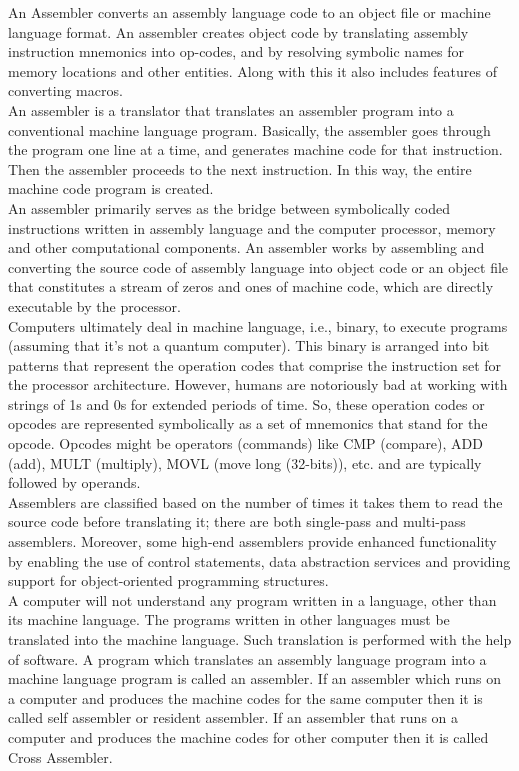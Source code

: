 \documentclass[12pt]{article}
\begin{document}
An Assembler converts an assembly language code to an object file or machine language format. An assembler creates object code by translating assembly instruction mnemonics into op-codes, and by resolving symbolic names for memory locations and other entities. Along with this it also includes features of converting macros.
\\An assembler is a translator that translates an assembler program into a conventional machine language program. Basically, the assembler goes through the program one line at a time, and generates machine code for that instruction. Then the assembler proceeds to the next instruction. In this way, the entire machine code program is created.
\\

An assembler primarily serves as the bridge between symbolically coded instructions written in assembly language and the computer processor, memory and other computational components. An assembler works by assembling and converting the source code of assembly language into object code or an object file that constitutes a stream of zeros and ones of machine code, which are directly executable by the processor.
\\Computers ultimately deal in machine language, i.e., binary, to execute programs (assuming that it's not a quantum computer).  This binary is arranged into bit patterns that represent the operation codes that comprise the instruction set for the processor architecture.  However, humans are notoriously bad at working with strings of 1s and 0s for extended periods of time.  So, these operation codes or opcodes are represented symbolically as a set of mnemonics that stand for the opcode.  Opcodes might be operators (commands)  like CMP (compare), ADD (add), MULT (multiply), MOVL (move long (32-bits)), etc. and are typically followed by operands.\\
Assemblers are classified based on the number of times it takes them to read the source code before translating it; there are both single-pass and multi-pass assemblers. Moreover, some high-end assemblers provide enhanced functionality by enabling the use of control statements, data abstraction services and providing support for object-oriented programming structures.
\\
 A computer will not understand any program written in a language, other than its machine language. The programs written in other languages must be translated into the machine language. Such translation is performed with the help of software. A program which translates an assembly language program into a machine language program is called an assembler. If an assembler which runs on a computer and produces the machine codes for the same computer then it is called self assembler or resident assembler. If an assembler that runs on a computer and produces the machine codes for other computer then it is called Cross Assembler.
\end{document}
